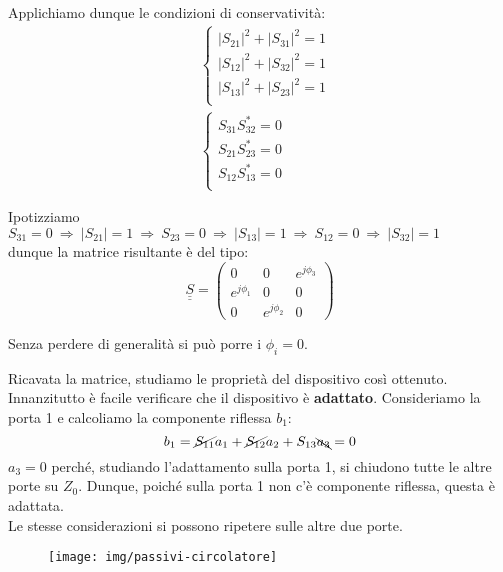 Applichiamo dunque le condizioni di conservatività: 
\begin{align*}
&\begin{cases}
|S_{21}|^2 + |S_{31}|^2 = 1\\
|S_{12}|^2 + |S_{32}|^2 = 1\\
|S_{13}|^2 + |S_{23}|^2 = 1\\
\end{cases}
\\
&\begin{cases}
S_{31}S_{32}^*=0\\
S_{21}S_{23}^*=0\\
S_{12}S_{13}^*=0\\
\end{cases}
\end{align*}

Ipotizziamo $S_{31} = 0 \ \Rightarrow \ |S_{21}| = 1 \ \Rightarrow \ S_{23} = 0 \ \Rightarrow \ |S_{13}| = 1
\ \Rightarrow \ S_{12} = 0
\ \Rightarrow \ |S_{32}| = 1$ \\
dunque la matrice risultante è del tipo:
\[
\underline{\underline{S}}=
\left(
\begin{array}{ccc}
0 & 0 & e^{j\phi_3}\\
e^{j\phi_1} & 0 & 0\\
0 & e^{j\phi_2} & 0
\end{array}
\right)
\]

Senza perdere di generalità si può porre i $\phi_i=0$.


Ricavata la matrice, studiamo le proprietà del dispositivo così ottenuto. Innanzitutto è facile verificare che il dispositivo è \textbf{adattato}. Consideriamo la porta 1 e calcoliamo la componente riflessa $b_1$:
\[b_1 = \cancel{S_{11}}a_1+\cancel{S_{12}}a_2+S_{13}\bcancel{a_3} = 0\]
$a_3 = 0$ perché, studiando l'adattamento sulla porta 1, si chiudono tutte le altre porte su $Z_0$. Dunque, poiché sulla porta 1 non c'è componente riflessa, questa è adattata.\\
Le stesse considerazioni si possono ripetere sulle altre due porte.

\begin{figure}[tbh]
	\centering
	\texttt{[image: img/passivi-circolatore]}
	\caption{}
	\label{fig:passivi-circolatore}
\end{figure}

